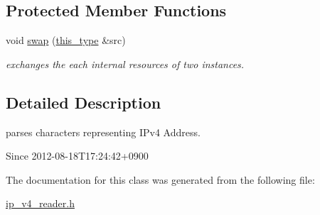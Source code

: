 \subsection*{Protected Member Functions}
\begin{DoxyCompactItemize}
\item 
\hypertarget{classhryky_1_1ip_1_1v4_1_1_reader_a0fb6b282c15e18b36124dd99f466fd13}{void \hyperlink{classhryky_1_1ip_1_1v4_1_1_reader_a0fb6b282c15e18b36124dd99f466fd13}{swap} (\hyperlink{classhryky_1_1ip_1_1v4_1_1_reader_a007590474d740ed246e201fe227b618f}{this\-\_\-type} \&src)}\label{classhryky_1_1ip_1_1v4_1_1_reader_a0fb6b282c15e18b36124dd99f466fd13}

\begin{DoxyCompactList}\small\item\em exchanges the each internal resources of two instances. \end{DoxyCompactList}\end{DoxyCompactItemize}


\subsection{Detailed Description}
parses characters representing I\-Pv4 Address. 

\begin{DoxySince}{Since}
2012-\/08-\/18\-T17\-:24\-:42+0900 
\end{DoxySince}


The documentation for this class was generated from the following file\-:\begin{DoxyCompactItemize}
\item 
\hyperlink{ip__v4__reader_8h}{ip\-\_\-v4\-\_\-reader.\-h}\end{DoxyCompactItemize}
